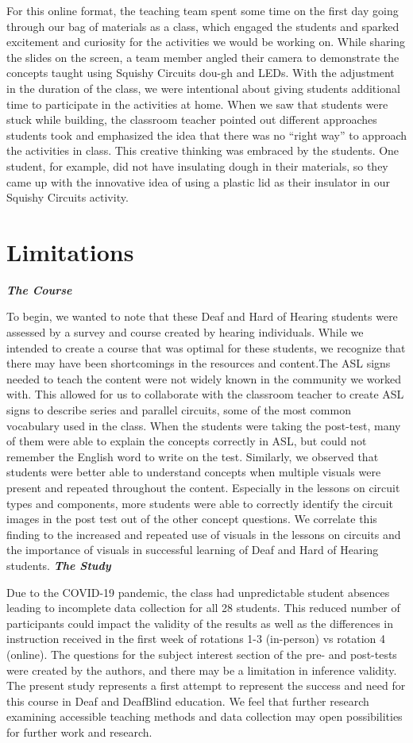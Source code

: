 \documentclass[11.5pt]{sig-alternate}
\begin{document}
\begin{large}
For this online format, the teaching team spent some time on the first day going through our bag of materials as a class, which engaged the students and sparked excitement and curiosity for the activities we would be working on. While sharing the slides on the screen, a team member angled their camera to demonstrate the concepts taught using Squishy Circuits dou-gh and LEDs. With the adjustment in the duration of the class, we were intentional about giving students additional time to participate in the activities at home. When we saw that students were stuck while building, the classroom teacher pointed out different approaches students took and emphasized the idea that there was no “right way” to approach the activities in class. This creative thinking was embraced by the students. One student, for example, did not have insulating dough in their materials, so they came up with the innovative idea of using a plastic lid as their insulator in our Squishy Circuits activity.
\section*{ Limitations}
\textbf{\textit{The Course}}

To begin, we wanted to note that these Deaf and Hard of Hearing students were assessed by a survey and course created by hearing individuals. While we intended to create a course that was optimal for these students, we recognize that there may have been shortcomings in the resources and content.The ASL signs needed to teach the content were not widely known in the community we worked with. This allowed for us to collaborate with the classroom teacher to create ASL signs to describe series and parallel circuits, some of the most common vocabulary used in the class. When the students were taking the post-test, many of them were able to explain the concepts correctly in ASL, but could not remember the English word to write on the test. Similarly, we observed that students were better able to understand concepts when multiple visuals were present and repeated throughout the content. Especially in the lessons on circuit types and components, more students were able to correctly identify the circuit images in the post test out of the other concept questions. We correlate this finding to the increased and repeated use of visuals in the lessons on circuits and the importance of visuals in successful learning of Deaf and Hard of Hearing students.
\newpage
\textbf{\textit{The Study}}

Due to the COVID-19 pandemic, the class had unpredictable student absences leading to incomplete data collection for all 28 students. This reduced number of participants could impact the validity of the results as well as the differences in instruction received in the first week of rotations 1-3 (in-person) vs rotation 4 (online). The questions for the subject interest section of the pre- and post-tests were created by the authors, and there may be a limitation in inference validity. The present study represents a first attempt to represent the success and need for this course in Deaf and DeafBlind education. We feel that further research examining accessible teaching methods and data collection may open possibilities for further work and research.
\newpage

\end{large}
\end{document}
